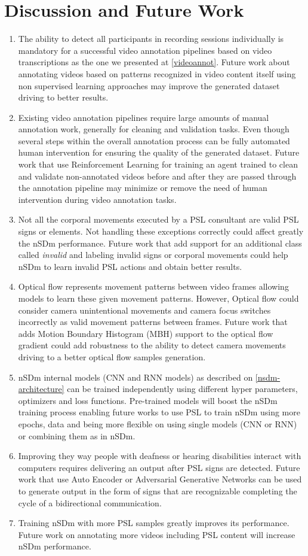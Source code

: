 \documentclass[twocolumn,conference]{article}
\begin{document}
\section{Discussion and Future Work}\label{discussion-future-work}
\begin{enumerate}[•]
\item The ability to detect all participants in recording sessions individually is mandatory for a successful video annotation pipelines based on video transcriptions as the one we presented at \ref{videoannot}. Future work about annotating videos based on patterns recognized in video content itself using non supervised learning approaches may improve the generated dataset driving to better results.
\item Existing video annotation pipelines require large amounts of manual annotation work, generally for cleaning and validation tasks. Even though several steps within the overall annotation process can be fully automated human intervention for ensuring the quality of the generated dataset. Future work that use Reinforcement Learning for training an agent trained to clean and validate non-annotated videos before and after they are passed through the annotation pipeline may minimize or remove the need of human intervention during video annotation tasks. 
\item Not all the corporal movements executed by a PSL consultant are valid PSL signs or elements. Not handling these exceptions correctly could affect greatly the nSDm performance. Future work that add support for an additional class called \textit{invalid} and labeling invalid signs or corporal movements could help nSDm to learn invalid PSL actions and obtain better results.
\item Optical flow represents movement patterns between video frames allowing models to learn these given movement patterns. However, Optical flow could consider camera unintentional movements and camera focus switches incorrectly as valid movement patterns between frames. Future work that adds Motion Boundary Histogram (MBH) \cite{wang2013dense} support to the optical flow gradient could add robustness to the ability to detect camera movements driving to a better optical flow samples generation.
\item nSDm internal models (CNN and RNN models) as described on \ref{nsdm-architecture} can be trained independently using different hyper parameters, optimizers and loss functions. Pre-trained models will boost the nSDm training process enabling future works to use PSL to train nSDm using more epochs, data and being more flexible on using single models (CNN or RNN) or combining them as in nSDm. 
\item Improving they way people with deafness or hearing disabilities interact with computers requires delivering an output after PSL signs are detected. Future work that use Auto Encoder or Adversarial Generative Networks can be used to generate output in the form of signs that are recognizable completing the cycle of a bidirectional communication.
\item Training nSDm with more PSL samples greatly improves its performance. Future work on annotating more videos including PSL content will increase nSDm performance.


\end{enumerate}
\end{document}
